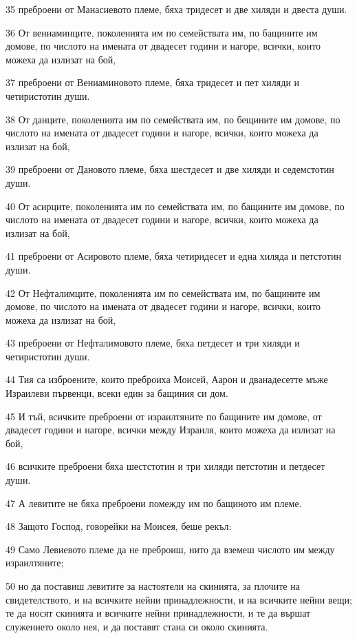 \par 35 преброени от Манасиевото племе, бяха тридесет и две хиляди и двеста души.
\par 36 От вениаминците, поколенията им по семействата им, по бащините им домове, по числото на имената от двадесет години и нагоре, всички, които можеха да излизат на бой,
\par 37 преброени от Вениаминовото племе, бяха тридесет и пет хиляди и четиристотин души.
\par 38 От данците, поколенията им по семействата им, по бещините им домове, по числото на имената от двадесет години и нагоре, всички, които можеха да излизат на бой,
\par 39 преброени от Дановото племе, бяха шестдесет и две хиляди и седемстотин души.
\par 40 От асирците, поколенията им по семействата им, по бащините им домове, по числото на имената от двадесет години и нагоре, всички, които можеха да излизат на бой,
\par 41 преброени от Асировото племе, бяха четиридесет и една хиляда и петстотин души.
\par 42 От Нефталимците, поколенията им по семействата им, по бащините им домове, по числото на имената от двадесет години и нагоре, всички, които можеха да излизат на бой,
\par 43 преброени от Нефталимовото племе, бяха петдесет и три хиляди и четиристотин души.
\par 44 Тия са изброените, които преброиха Моисей, Аарон и дванадесетте мъже Израилеви първенци, всеки един за бащиния си дом.
\par 45 И тъй, всичките преброени от израилтяните по бащините им домове, от двадесет години и нагоре, всички между Израиля, които можеха да излизат на бой,
\par 46 всичките преброени бяха шестстотин и три хиляди петстотин и петдесет души.
\par 47 А левитите не бяха преброени помежду им по бащиното им племе.
\par 48 Защото Господ, говорейки на Моисея, беше рекъл:
\par 49 Само Левиевото племе да не преброиш, нито да вземеш числото им между израилтяните;
\par 50 но да поставиш левитите за настоятели на скинията, за плочите на свидетелството, и на всичките нейни принадлежности, и на всичките нейни вещи; те да носят скинията и всичките нейни принадлежности, и те да вършат служението около нея, и да поставят стана си около скинията.
